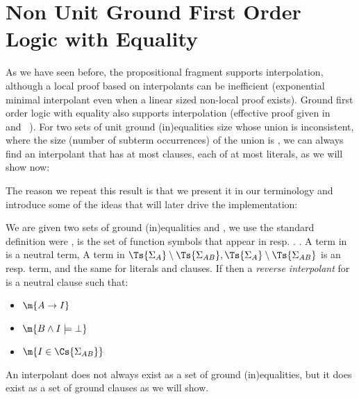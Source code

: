 \chapter{Non Unit Ground First Order Logic with Equality}
As we have seen before, the propositional fragment supports interpolation, although a local proof based on interpolants can be inefficient (exponential minimal interpolant even when a linear sized non-local proof exists). 
Ground first order logic with equality also supports interpolation (effective proof given in ~\cite{McMillan05} and ~\cite{FuchsGoelGrundyKrsticTinelli2012}). 
For two sets of unit ground (in)equalities size whose union is inconsistent, where the size (number of subterm occurrences) of the union is , we can always find an interpolant that has at most  clauses, each of at most  literals, as we will show now:

The reason we repeat this result is that we present it in our terminology and introduce some of the ideas that will later drive the implementation:

We are given two sets of ground (in)equalities  and , we use the standard definition were , is the set of function symbols that appear in  resp. . .
A term in  is a neutral term, A term in $\Ts{\Sigma_{A}} \setminus \Ts{\Sigma_{AB}},\Ts{\Sigma_{A}} \setminus \Ts{\Sigma_{AB}}$ is an  resp.  term, and the same for literals and clauses.
If  then a \emph{reverse interpolant}  for  is a neutral clause such that:
\begin{itemize}
	\item $\m{A \rightarrow I}$
	\item $\m{B \land I \models \bot}$
	\item $\m{I \in \Cs{\Sigma_{AB}}}$
\end{itemize}

An interpolant does not always exist as a set of ground (in)equalities, but it does exist as a set of ground clauses as we will show.

